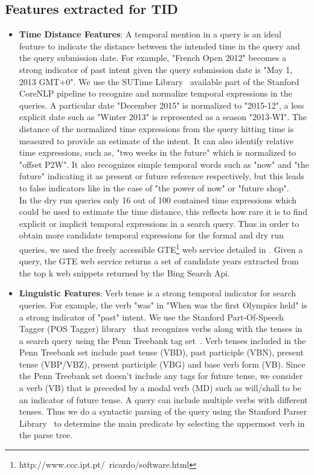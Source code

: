 \documentclass{sig-alternate}
\begin{document}
\subsection{Features extracted for TID}
\begin{itemize}
\item\textbf{Time Distance Features}: A temporal mention in a query is an ideal feature to indicate the distance between the intended time in the query and the query submission date. For example, "French Open 2012" becomes a strong indicator of past intent given the query submission date is "May 1, 2013 GMT+0". We use the SUTime Library~\cite{sutime} available part of the Stanford CoreNLP pipeline to recognize and normalize temporal expressions in the queries. A particular date "December 2015" is normalized to "2015-12", a less explicit date such as "Winter 2013" is represented as a season "2013-WI". The distance of the normalized time expressions from the query hitting time is measured to provide an estimate of the intent. It can also identify relative time expressions, such as, "two weeks in the future" which is normalized to "offset P2W". It also recognizes simple temporal words such as "now" and "the future" indicating it as present or future reference respectively, but this leads to false indicators like in the case of "the power of now" or "future shop". 
\\
In the dry run queries only 16 out of 100 contained time expressions which could be used to estimate the time distance, this reflects how rare it is to find explicit or implicit temporal expressions in a search query. Thus in order to obtain more candidate temporal expressions for the formal and dry run queries, we used the freely accessible GTE\footnote{http://www.ccc.ipt.pt/~ricardo/software.html} web service detailed in \cite{gte}. Given a query, the GTE web service returns a set of candidate years extracted from the top k web snippets returned by the Bing Search Api.  
\item\textbf{Linguistic Features}:
Verb tense is a strong temporal indicator for search queries. For example, the verb "was" in "When was the first Olympics held" is a strong indicator of "past" intent. We use the Stanford Part-Of-Speech Tagger (POS Tagger) library~\cite{postagger} that recognizes verbs along with the tenses in a search query using the Penn Treebank tag set~\cite{penn}. Verb tenses included in the Penn Treebank set include past tense (VBD), past participle (VBN), present tense (VBP/VBZ), present participle (VBG) and base verb form (VB). Since the Penn Treebank set doesn't include any tags for future tense, we consider a verb (VB) that is preceded by a modal verb (MD) such as will/shall to be an indicator of future tense. A query can include multiple verbs with different tenses. Thus we do a syntactic parsing of the query using the Stanford Parser Library~\cite{parser} to determine the main predicate by selecting the uppermost verb in the parse tree. 

\end{itemize}
\end{document}
